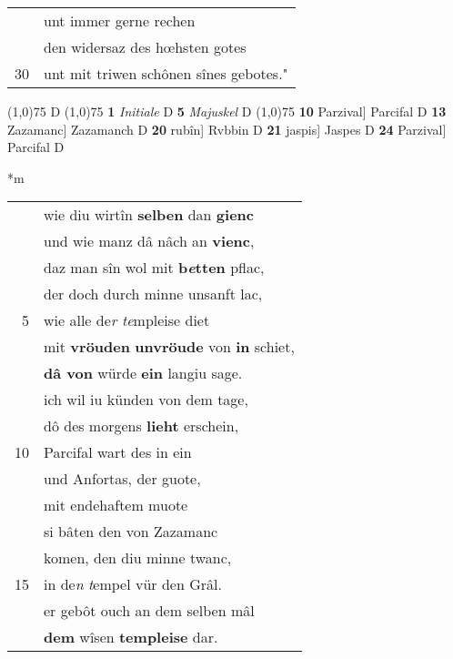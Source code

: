\documentclass[8pt,a4paper,notitlepage]{article}
\begin{document}
\begin{table}[ht]
\begin{minipage}[t]{0.5\linewidth}
\begin{tabular}{rl}
 & unt immer gerne rechen\\ 
 & den widersaz des hœhsten gotes\\ 
30 & unt mit triwen schônen sînes gebotes."\\ 
\end{tabular}
\scriptsize
\line(1,0){75} \newline
D \newline
\line(1,0){75} \newline
\textbf{1} \textit{Initiale} D  \textbf{5} \textit{Majuskel} D  \newline
\line(1,0){75} \newline
\textbf{10} Parzival] Parcifal D \textbf{13} Zazamanc] Zazamanch D \textbf{20} rubîn] Rvbbin D \textbf{21} jaspis] Jaspes D \textbf{24} Parzival] Parcifal D \newline
\end{minipage}
\hspace{0.5cm}
\begin{minipage}[t]{0.5\linewidth}
\small
\begin{center}*m
\end{center}
\begin{tabular}{rl}
 & wie diu wirtîn \textbf{selben} dan \textbf{gienc}\\ 
 & und wie manz dâ nâch an \textbf{vienc},\\ 
 & daz man sîn wol mit \textbf{b\textit{e}tten} pflac,\\ 
 & der doch durch minne unsanft lac,\\ 
5 & wie alle de\textit{r} \textit{te}mpleise diet\\ 
 & mit \textbf{vröuden} \textbf{unvröude} von \textbf{in} schiet,\\ 
 & \textbf{dâ von} würde \textbf{ein} langiu sage.\\ 
 & ich wil iu künden von dem tage,\\ 
 & dô des morgens \textbf{lieht} erschein,\\ 
10 & Parcifal wart des in ein\\ 
 & und Anfortas, der guote,\\ 
 & mit endehaftem muote\\ 
 & si bâten den von Zazamanc\\ 
 & komen, den diu minne twanc,\\ 
15 & in de\textit{n} \textit{t}empel vür den Grâl.\\ 
 & er gebôt ouch an dem selben mâl\\ 
 & \textbf{dem} wîsen \textbf{templeise} dar.\\ 

\end{tabular}
\end{minipage}
\end{table}
\end{document}
